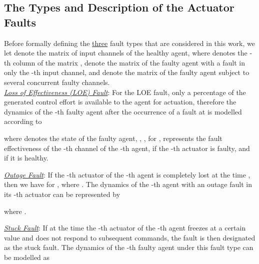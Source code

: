 \documentclass[12pt,draftcls,onecolumn]{IEEEtran}
\begin{document}
\subsection{The Types and Description of the Actuator  Faults} 
Before formally defining the \underline{three} fault types that are considered in this work, we let  denote the matrix of  input channels of the healthy agent, where  denotes the -th column of the matrix ,   denote the matrix of the  faulty agent with a fault in only the -th input channel,  and  denote the matrix of the  faulty agent subject to several concurrent faulty channels. \\
\underline{\emph{Loss of Effectiveness (LOE) Fault}}: 
For the LOE fault, only a percentage of the generated control effort is available to the agent for actuation, therefore the dynamics of the -th faulty agent after the occurrence of a fault at  is modelled according to 

where  denotes the state of the faulty agent, , , for ,  represents the fault effectiveness  of the -th channel of the -th agent,  if the -th actuator is faulty, and  if it is healthy. \par
\noindent \underline{\emph{Outage Fault}}: If the -th actuator of the -th agent is completely  lost at the time , then we have  for , where . The dynamics of the -th agent with an outage fault in its -th actuator can be represented by 
 
where  .\par
\noindent \underline{\emph{Stuck Fault}}: If at the time  the -th actuator of the -th agent  freezes at a certain value and does not respond to subsequent commands, the fault is then designated as the stuck fault.  The dynamics of the -th faulty agent under this  fault type can be modelled as
 
\end{document}
